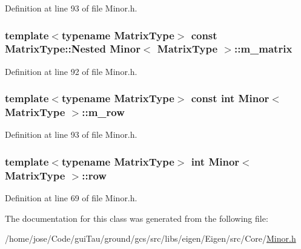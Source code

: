 Definition at line 93 of file Minor.\-h.

\hypertarget{class_minor_a0da370e5ee24eafe1fff3fb1703ab1bb}{
\subsubsection[{m\-\_\-matrix}]{\setlength{\rightskip}{0pt plus 5cm}template$<$typename Matrix\-Type$>$ const Matrix\-Type\-::\-Nested {\bf Minor}$<$ Matrix\-Type $>$\-::m\-\_\-matrix\hspace{0.3cm}{\ttfamily [protected]}}}\label{class_minor_a0da370e5ee24eafe1fff3fb1703ab1bb}


Definition at line 92 of file Minor.\-h.

\hypertarget{class_minor_af1cc8170a50e957e93d3f7c1fb8cfe00}{
\subsubsection[{m\-\_\-row}]{\setlength{\rightskip}{0pt plus 5cm}template$<$typename Matrix\-Type$>$ const {\bf int} {\bf Minor}$<$ Matrix\-Type $>$\-::m\-\_\-row\hspace{0.3cm}{\ttfamily [protected]}}}\label{class_minor_af1cc8170a50e957e93d3f7c1fb8cfe00}


Definition at line 93 of file Minor.\-h.

\hypertarget{class_minor_aed84dc350a249af6b212117b823c59df}{
\subsubsection[{row}]{\setlength{\rightskip}{0pt plus 5cm}template$<$typename Matrix\-Type$>$ {\bf int} {\bf Minor}$<$ Matrix\-Type $>$\-::{\bf row}}}\label{class_minor_aed84dc350a249af6b212117b823c59df}


Definition at line 69 of file Minor.\-h.



The documentation for this class was generated from the following file\-:\begin{DoxyCompactItemize}
\item 
/home/jose/\-Code/gui\-Tau/ground/gcs/src/libs/eigen/\-Eigen/src/\-Core/\hyperlink{_minor_8h}{Minor.\-h}\end{DoxyCompactItemize}
